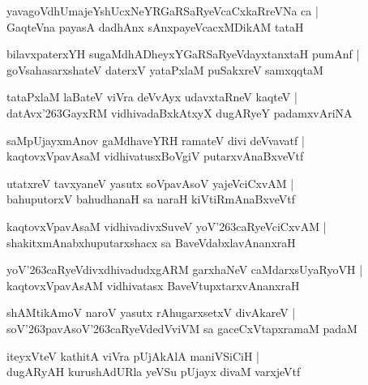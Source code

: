 \documentclass[twoside,12pt,openright]{book}
\def\S{\char'263}
\newcounter{shloka}[chapter]
\begin{document}
\begin{shloka}%
yavagoVdhUmajeYshUcxNeYRGaRSaRyeVcaCxkaRreVNa ca |\\
GaqteVna payasA dadhAnx sAnxpayeVcacxMDikAM tataH 
\end{shloka}

\begin{shloka}%
bilavxpaterxYH sugaMdhADheyxYGaRSaRyeVdayxtanxtaH pumAnf |\\
goVsahasarxshateV daterxV yataPxlaM puSakxreV samxqqtaM
\end{shloka}

\begin{shloka}%
tataPxlaM laBateV viVra deVvAyx udavxtaRneV kaqteV |\\
datAvx\S GayxRM vidhivadaBxkAtxyX dugARyeY padamxvAriNA 
\end{shloka}

\begin{shloka}%
saMpUjayxmAnov gaMdhaveYRH ramateV divi deVvavatf |\\
kaqtovxVpavAsaM vidhivatusxBoVgiV putarxvAnaBxveVtf
\end{shloka}

\begin{shloka}%
utatxreV tavxyaneV yasutx soVpavAsoV yajeVciCxvAM |\\
bahuputorxV bahudhanaH sa naraH kiVtiRmAnaBxveVtf 
\end{shloka}

\begin{shloka}%
kaqtovxVpavAsaM vidhivadivxSuveV yoV\S caRyeVciCxvAM |\\
shakitxmAnabxhuputarxshacx sa BaveVdabxlavAnanxraH 
\end{shloka}

\begin{shloka}%
yoV\S caRyeVdivxdhivadudxgARM garxhaNeV caMdarxsUyaRyoVH |\\
kaqtovxVpavAsAM vidhivatasx BaveVtupxtarxvAnanxraH 
\end{shloka}

\begin{shloka}%
shAMtikAmoV naroV yasutx rAhugarxsetxV divAkareV |\\
soV\S pavAsoV\S caRyeVdedVviVM sa gaceCxVtapxramaM padaM 
\end{shloka}

\begin{shloka}%
iteyxVteV kathitA viVra pUjAkAlA maniVSiCiH |\\
dugARyAH kurushAdURla yeVSu pUjayx divaM varxjeVtf 
\end{shloka}
\end{document}
